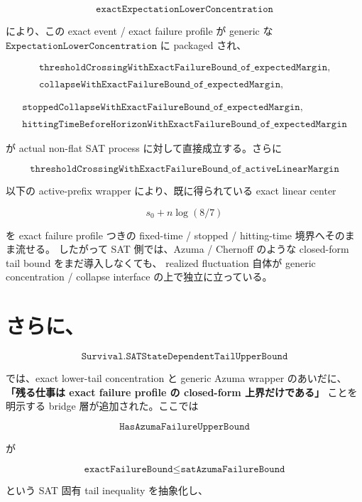 \documentclass[12pt,a4paper]{article}
\begin{document}
\[
\texttt{exactExpectationLowerConcentration}
\]

により、この exact event / exact failure profile が generic な \(\texttt{ExpectationLowerConcentration}\) に packaged され、

\[
\begin{aligned}
\texttt{thresholdCrossingWithExactFailureBound\_of\_expectedMargin}, \\
\qquad \\
\texttt{collapseWithExactFailureBound\_of\_expectedMargin},
\end{aligned}
\]

\[
\begin{aligned}
\texttt{stoppedCollapseWithExactFailureBound\_of\_expectedMargin}, \\
\qquad \\
\texttt{hittingTimeBeforeHorizonWithExactFailureBound\_of\_expectedMargin}
\end{aligned}
\]

が actual non-flat SAT process に対して直接成立する。さらに

\[
\texttt{thresholdCrossingWithExactFailureBound\_of\_activeLinearMargin}
\]

以下の active-prefix wrapper により、既に得られている exact linear center

\[
s_0 + n\log(8/7)
\]

を exact failure profile つきの fixed-time / stopped / hitting-time 境界へそのまま流せる。 したがって SAT 側では、Azuma / Chernoff のような closed-form tail bound をまだ導入しなくても、 realized fluctuation 自体が generic concentration / collapse interface の上で独立に立っている。

\section{さらに、}\label{ux3055ux3089ux306b-20}

\[
\texttt{Survival.SATStateDependentTailUpperBound}
\]

では、exact lower-tail concentration と generic Azuma wrapper のあいだに、 \textbf{「残る仕事は exact failure profile の closed-form 上界だけである」} ことを明示する bridge 層が追加された。ここでは

\[
\texttt{HasAzumaFailureUpperBound}
\]

が

\[
\texttt{exactFailureBound} \le \texttt{satAzumaFailureBound}
\]

という SAT 固有 tail inequality を抽象化し、
\end{document}

